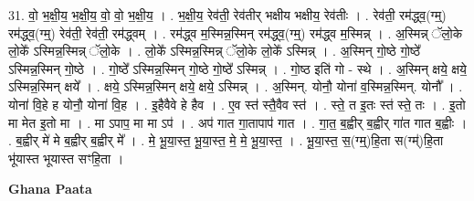 \documentclass[17pt]{extarticle}
\begin{document}
31. वो॒ भ॒क्षी॒य॒ भ॒क्षी॒य॒ वो॒ वो॒ भ॒क्षी॒य॒ । . भ॒क्षी॒य॒ रेव॑ती॒ रेव॑तीर् भक्षीय भक्षीय॒ रेव॑तीः । . रेव॑ती॒ रम॑द्ध्व॒(ग्म्॒) रम॑द्ध्व॒(ग्म्॒) रेव॑ती॒ रेव॑ती॒ रम॑द्ध्वम् । . रम॑द्ध्व म॒स्मिन्न॒स्मिन् रम॑द्ध्व॒(ग्म्॒) रम॑द्ध्व म॒स्मिन्न् । . अ॒स्मिन्न् ॅलो॒के लो॒के᳚ ऽस्मिन्न॒स्मिन्न् ॅलो॒के । . लो॒के᳚ ऽस्मिन्न॒स्मिन्न् ॅलो॒के लो॒के᳚ ऽस्मिन्न् । . अ॒स्मिन् गो॒ष्ठे गो॒ष्ठे᳚ ऽस्मिन्न॒स्मिन् गो॒ष्ठे । . गो॒ष्ठे᳚ ऽस्मिन्न॒स्मिन् गो॒ष्ठे गो॒ष्ठे᳚ ऽस्मिन्न् । . गो॒ष्ठ इति॑ गो - स्थे । . अ॒स्मिन् क्षये॒ क्षये॒ ऽस्मिन्न॒स्मिन् क्षये᳚ । . क्षये॒ ऽस्मिन्न॒स्मिन् क्षये॒ क्षये॒ ऽस्मिन्न् । . अ॒स्मिन्. योनौ॒ योना॑ व॒स्मिन्न॒स्मिन्. योनौ᳚ । . योना॑ वि॒हे ह योनौ॒ योना॑ वि॒ह । . इ॒हैवैवे हे हैव । . ए॒व स्त॑ स्तै॒वैव स्त॑ । . स्ते॒ त इ॒तः स्त॑ स्ते॒ तः । . इ॒तो मा मेत इ॒तो मा । . मा ऽपाप॒ मा मा ऽप॑ । . अप॑ गात गा॒तापाप॑ गात । . गा॒त॒ ब॒ह्वीर् ब॒ह्वीर् गा॑त गात ब॒ह्वीः । . ब॒ह्वीर् मे॑ मे ब॒ह्वीर् ब॒ह्वीर् मे᳚ । . मे॒ भू॒या॒स्त॒ भू॒या॒स्त॒ मे॒ मे॒ भू॒या॒स्त॒ । . भू॒या॒स्त॒ स॒(ग्म्॒)हि॒ता स(ग्म्॑)हि॒ता भू॑यास्त भूयास्त सꣳहि॒ता । \newline

\textbf{Ghana Paata } \newline
\end{document}
